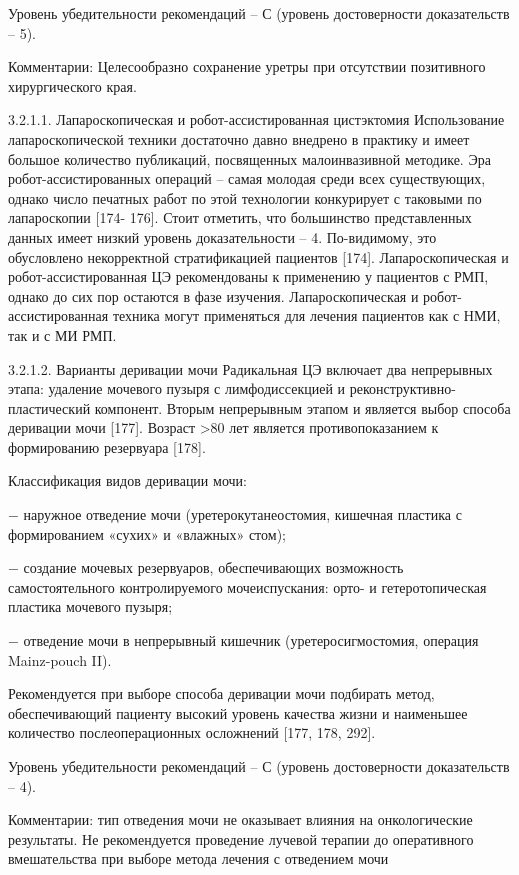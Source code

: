 Уровень убедительности рекомендаций – С (уровень достоверности доказательств – 5).

Комментарии: Целесообразно сохранение уретры при отсутствии позитивного хирургического края.

3.2.1.1. Лапароскопическая и робот-ассистированная цистэктомия
Использование лапароскопической техники достаточно давно внедрено в практику и имеет большое количество публикаций, посвященных малоинвазивной методике. Эра робот-ассистированных операций – самая молодая среди всех существующих, однако число печатных работ по этой технологии конкурирует с таковыми по лапароскопии [174- 176]. Стоит отметить, что большинство представленных данных имеет низкий уровень доказательности – 4. По-видимому, это обусловлено некорректной стратификацией пациентов [174]. Лапароскопическая и робот-ассистированная ЦЭ рекомендованы к применению у пациентов с РМП, однако до сих пор остаются в фазе изучения. Лапароскопическая и робот-ассистированная техника могут применяться для лечения пациентов как с НМИ, так и с МИ РМП.

3.2.1.2. Варианты деривации мочи
Радикальная ЦЭ включает два непрерывных этапа: удаление мочевого пузыря с лимфодиссекцией и реконструктивно-пластический компонент. Вторым непрерывным этапом и является выбор способа деривации мочи [177]. Возраст >80 лет является противопоказанием к формированию резервуара [178].

Классификация видов деривации мочи:

− наружное отведение мочи (уретерокутанеостомия, кишечная пластика с формированием «сухих» и «влажных» стом);

− создание мочевых резервуаров, обеспечивающих возможность самостоятельного контролируемого мочеиспускания: орто- и гетеротопическая пластика мочевого пузыря;

− отведение мочи в непрерывный кишечник (уретеросигмостомия, операция Mainz-pouch II).

Рекомендуется при выборе способа деривации мочи подбирать метод, обеспечивающий пациенту высокий уровень качества жизни и наименьшее количество послеоперационных осложнений [177, 178, 292].

Уровень убедительности рекомендаций – С (уровень достоверности доказательств – 4).

Комментарии: тип отведения мочи не оказывает влияния на онкологические результаты. Не рекомендуется проведение лучевой терапии до оперативного вмешательства при выборе метода лечения с отведением мочи


